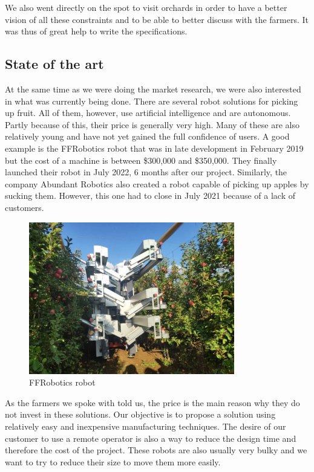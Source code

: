 \bigbreak
We also went directly on the spot to visit orchards in order to have a better vision of all these constraints and to be able to better discuss with the farmers. It was thus of great help to write the specifications. 

\subsection{State of the art}

At the same time as we were doing the market research, we were also interested in what was currently being done. There are several robot solutions for picking up fruit. All of them, however, use artificial intelligence and are autonomous. Partly because of this, their price is generally very high. Many of these are also relatively young and have not yet gained the full confidence of users. A good example is the FFRobotics robot that was in late development in February 2019 but the cost of a machine is between \$300,000 and \$350,000. They finally launched their robot in July 2022, 6 months after our project. Similarly, the company Abundant Robotics also created a robot capable of picking up apples by sucking them. However, this one had to close in July 2021 because of a lack of customers.
\begin{figure}[ht]
    \centering
    \includegraphics[width=0.8\textwidth]{Images/Section01/ffRobotics.png}
    \caption{FFRobotics robot}
    \label{fig:ffRobotics}
\end{figure}

\bigbreak
As the farmers we spoke with told us, the price is the main reason why they do not invest in these solutions. Our objective is to propose a solution using relatively easy and inexpensive manufacturing techniques. The desire of our customer to use a remote operator is also a way to reduce the design time and therefore the cost of the project. These robots are also usually very bulky and we want to try to reduce their size to move them more easily.

